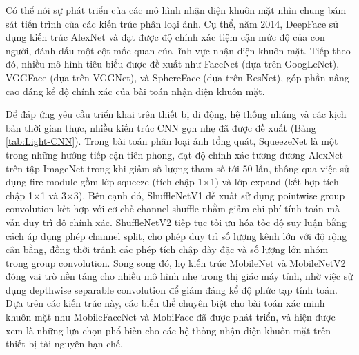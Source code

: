 Có thể nói sự phát triển của các mô hình nhận diện khuôn mặt nhìn chung bám sát tiến trình của các kiến trúc phân loại ảnh. Cụ thể, năm 2014, DeepFace sử dụng kiến trúc AlexNet và đạt được độ chính xác tiệm cận mức độ của con người, đánh dấu một cột mốc quan của lĩnh vực nhận diện khuôn mặt\cite{18_s25051410}. Tiếp theo đó, nhiều mô hình tiêu biểu được đề xuất như FaceNet (dựa trên GoogLeNet), VGGFace (dựa trên VGGNet), và SphereFace (dựa trên ResNet), góp phần nâng cao đáng kể độ chính xác của bài toán nhận diện khuôn mặt\cite{20_WANG2021215}.

Để đáp ứng yêu cầu triển khai trên thiết bị di động, hệ thống nhúng và các kịch bản thời gian thực, nhiều kiến trúc CNN gọn nhẹ đã được đề xuất (Bảng \ref{tab:Light-CNN}). Trong bài toán phân loại ảnh tổng quát, SqueezeNet \cite{43_article} là một trong những hướng tiếp cận tiên phong, đạt độ chính xác tương đương AlexNet trên tập ImageNet trong khi giảm số lượng tham số tới 50 lần, thông qua việc sử dụng fire module gồm lớp squeeze (tích chập 1×1) và lớp expand (kết hợp tích chập 1×1 và 3×3).
Bên cạnh đó, ShuffleNetV1 \cite{arc_Zhang_2018_CVPR} đề xuất sử dụng pointwise group convolution kết hợp với cơ chế channel shuffle nhằm giảm chi phí tính toán mà vẫn duy trì độ chính xác. ShuffleNetV2 \cite{arc_Ma_2018_ECCV} tiếp tục tối ưu hóa tốc độ suy luận bằng cách áp dụng phép channel split, cho phép duy trì số lượng kênh lớn với độ rộng cân bằng, đồng thời tránh các phép tích chập dày đặc và số lượng lớn nhóm trong group convolution. Song song đó, họ kiến trúc MobileNet \cite{ARC_howard_2017_mobilenets} và MobileNetV2 \cite{ARC_Sandler_2018_CVPR} đóng vai trò nền tảng cho nhiều mô hình nhẹ trong thị giác máy tính, nhờ việc sử dụng depthwise separable convolution để giảm đáng kể độ phức tạp tính toán. Dựa trên các kiến trúc này, các biến thể chuyên biệt cho bài toán xác minh khuôn mặt như MobileFaceNet \cite{16_chen_2018_mobilefacenets} và MobiFace đã được phát triển, và hiện được xem là những lựa chọn phổ biến cho các hệ thống nhận diện khuôn mặt trên thiết bị tài nguyên hạn chế.
